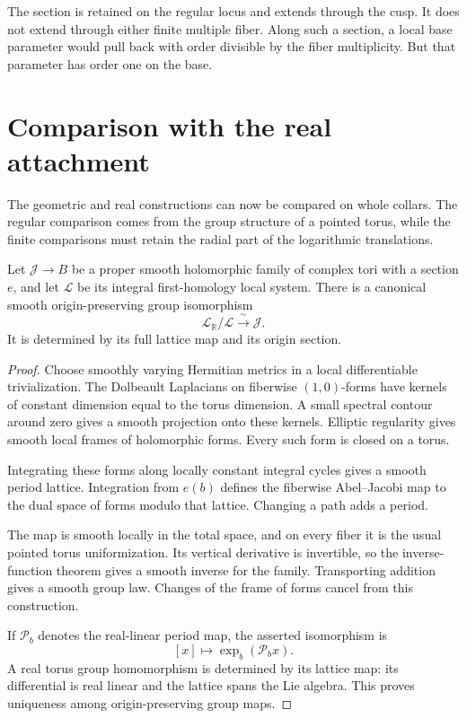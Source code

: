 \documentclass[11pt]{article}
\numberwithin{equation}{section}
\begin{document}
The section is retained on the regular locus and extends through
the cusp. It does not extend through either finite multiple fiber.
Along such a section, a local base parameter would pull back with
order divisible by the fiber multiplicity. But that parameter has
order one on the base.

\section{Comparison with the real attachment}\label{sec:geometric-comparison}

The geometric and real constructions can now be compared on whole
collars. The regular comparison comes from the group structure of a
pointed torus, while the finite comparisons must retain the radial
part of the logarithmic translations.

\begin{lemma}\label{cmp:lem:period-family}
Let $\mathscr J\to B$ be a proper smooth holomorphic family of
complex tori with a section $e$, and let $\mathscr L$ be its integral
first-homology local system. There is a canonical smooth
origin-preserving group isomorphism
\[
 \mathscr L_{\mathbb R}/\mathscr L\xrightarrow{\ \sim\ }\mathscr J.
\]
It is determined by its full lattice map and its origin section.
\end{lemma}

\begin{proof}
Choose smoothly varying Hermitian metrics in a local differentiable
trivialization. The Dolbeault Laplacians on fiberwise $(1,0)$-forms
have kernels of constant dimension equal to the torus dimension.
A small spectral contour around zero gives a smooth projection onto
these kernels. Elliptic regularity gives smooth local frames of
holomorphic forms. Every such form is closed on a torus.

Integrating these forms along locally constant integral cycles gives
a smooth period lattice. Integration from $e(b)$ defines the
fiberwise Abel--Jacobi map to the dual space of forms modulo that
lattice. Changing a path adds a period.

The map is smooth locally
in the total space, and on every fiber it is the usual pointed torus
uniformization. Its vertical derivative is invertible, so the
inverse-function theorem gives a smooth inverse for the family.
Transporting addition gives a smooth group law. Changes of the frame
of forms cancel from this construction.

If $\mathcal P_b$ denotes the real-linear period map, the asserted
isomorphism is
\[
 [x]\longmapsto\exp_b(\mathcal P_bx).
\]
A real torus group homomorphism is determined by its lattice map:
its differential is real linear and the lattice spans the Lie
algebra. This proves uniqueness among origin-preserving group maps.
\end{proof}
\end{document}
